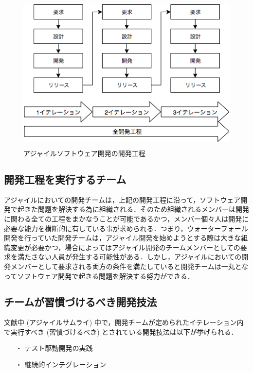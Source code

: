 \begin{figure}[H]
\centering
\includegraphics[height=8cm]{./assets/images/agile.png}
\caption{アジャイルソフトウェア開発の開発工程}
\label{fig:agile}
\end{figure}


\subsection{開発工程を実行するチーム}


アジャイルにおいての開発チームは，上記の開発工程に沿って，ソフトウェア開発で起きた問題を解決する為に組織される．そのため組織されるメンバーは開発に関わる全ての工程をまかなうことが可能であるかつ，メンバー個々人は開発に必要な能力を横断的に有している事が求められる．つまり，ウォーターフォール開発を行っていた開発チームは，アジャイル開発を始めようとする際は大きな組織変更が必要かつ，場合によってはアジャイル開発のチームメンバーとしての要求を満たさない人員が発生する可能性がある．しかし，アジャイルにおいての開発メンバーとして要求される両方の条件を満たしていると開発チームは一丸となってソフトウェア開発で起きる問題を解決する努力ができる．

\subsection{チームが習慣づけるべき開発技法}


文献中 (アジャイルサムライ) 中で，開発チームが定められたイテレーション内で実行すべき (習慣づけるべき) とされている開発技法は以下が挙げられる．

\begin{itemize}
 \item[・]テスト駆動開発の実践
 \item[・]継続的インテグレーション
\end{itemize}

